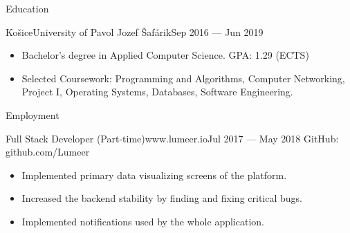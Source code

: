 \documentclass[]{style}
\begin{document}
	\makeheader
	
	\begin{cvsection}{Education}
		\begin{cvsubsection}{Košice}{University of Pavol Jozef Šafárik}{Sep 2016 — Jun 2019}
			\begin{itemize}
				\item Bachelor's degree in Applied Computer Science. GPA: 1.29 (ECTS)
				\item Selected Coursework: Programming and Algorithms, Computer Networking, Project I, Operating Systems, Databases, Software Engineering.
			\end{itemize}
		\end{cvsubsection}
	\end{cvsection}

	\begin{cvsection}{Employment}
		\begin{cvsubsection}{Full Stack Developer (Part-time)}{www.lumeer.io}{Jul 2017 — May 2018}
			GitHub: github.com/Lumeer
			\begin{itemize}
				\item Implemented primary data visualizing screens of the platform.
				\item Increased the backend stability by finding and fixing critical bugs.
				\item Implemented notifications used by the whole application.							
			\end{itemize}
		\end{cvsubsection}
	\end{cvsection}
	
\end{document}
